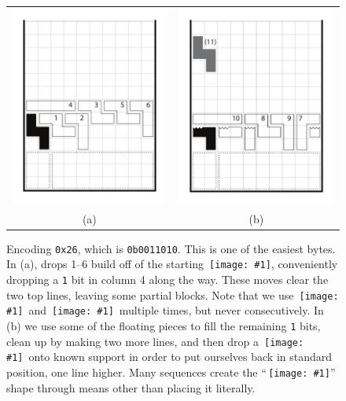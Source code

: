 \documentclass[twocolumn]{article}
\newcommand\tetrispiece[1]{\,\texttt{[image: \#1]}\hspace{0.1em}}
\newcommand\zhoriz{\tetrispiece{z_horiz}}
\newcommand\svert{\tetrispiece{s_vert}}
\newcommand\ldown{\tetrispiece{l_down}}
\begin{document}
\begin{figure}
  \centering
  \begin{tabular}{cc}
  \includegraphics[width=0.4 \linewidth]{encode26a} &
  \includegraphics[width=0.4 \linewidth]{encode26b} \\
  (a) & (b)
  \end{tabular}
  \caption{ Encoding {\tt 0x26}, which is {\tt 0b0011010}. This is one
    of the easiest bytes. In (a), drops 1--6 build off of the starting
    \svert, conveniently dropping a {\tt 1} bit in column 4 along the
    way. These moves clear the two top lines, leaving some partial
    blocks. Note that we use \zhoriz\ and \ldown\ multiple times, but
    never consecutively. In (b) we use some of the floating pieces to
    fill the remaining {\tt 1} bits, clean up by making two more
    lines, and then drop a \svert\ onto known support in order to put
    ourselves back in standard position, one line higher. Many
    sequences create the ``\svert'' shape through means other than
    placing it literally. } \label{fig:encode26}
\end{figure}
\end{document}
